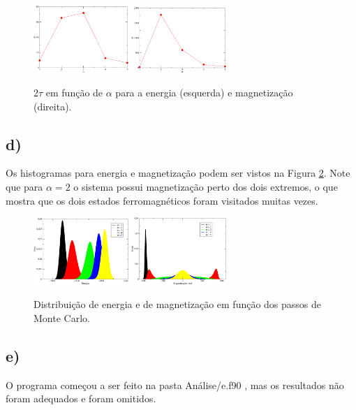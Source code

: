 \documentclass[a4wide]{report}
\begin{document}
\begin{figure}[!htb]
\centering
\includegraphics[width=0.32\textwidth]{2tau.pdf}
\includegraphics[width=0.32\textwidth]{2tau_mag.pdf}
\caption{2$\tau$ em função de $\alpha$ para a energia (esquerda) e magnetização (direita).  }
\label{1c}
\end{figure}

\subsection*{d) }
Os histogramas para energia e magnetização podem ser vistos na Figura \ref{1d}. Note que para $\alpha = 2$ o sistema possui magnetização perto dos dois extremos, o que mostra que os dois estados ferromagnéticos foram visitados muitas vezes. 
\begin{figure}[!htb]
\centering
\includegraphics[width=0.32\textwidth]{energia.pdf}
\includegraphics[width=0.32\textwidth]{mag.pdf}
\caption{Distribuição de energia e de magnetização em função dos passos de Monte Carlo.}
\label{1d}
\end{figure}

\subsection*{e)}
O programa começou a ser feito na pasta Análise/e.f90 , mas os resultados não foram adequados e foram omitidos.
\end{document}
